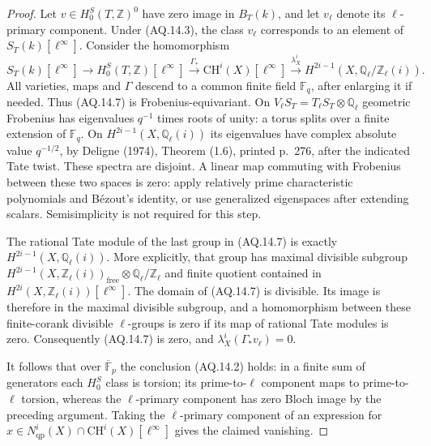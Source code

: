 \documentclass[11pt,a4paper]{article}
\theoremstyle{definition}\newtheorem{definition}[theorem]{Definition}
\theoremstyle{remark}\newtheorem{remark}[theorem]{Remark}
\begin{document}
\begin{proof}
Let $v\in H_0^S(T,\mathbb Z)^0$ have zero image in $B_T(k)$,
and let $v_\ell$ denote its $\ell$-primary component.
Under (AQ.14.3), the class $v_\ell$ corresponds to an
element of $S_T(k)[\ell^\infty]$. Consider the homomorphism
\[
 S_T(k)[\ell^\infty]\longrightarrow
 H_0^S(T,\mathbb Z)[\ell^\infty]
 \xrightarrow{\Gamma_*}\mathrm{CH}^i(X)[\ell^\infty]
 \xrightarrow{\lambda_X^i}
 H^{2i-1}(X,\mathbb Q_\ell/\mathbb Z_\ell(i)).                \tag{AQ.14.7}
\]
All varieties, maps and $\Gamma$ descend to a common finite
field $\mathbb F_q$, after enlarging it if needed. Thus
(AQ.14.7) is Frobenius-equivariant. On
$V_\ell S_T=T_\ell S_T\otimes\mathbb Q_\ell$ geometric
Frobenius has eigenvalues $q^{-1}$ times roots of unity:
a torus splits over a finite extension of $\mathbb F_q$.
On
$H^{2i-1}(X,\mathbb Q_\ell(i))$ its eigenvalues have
complex absolute value $q^{-1/2}$, by Deligne (1974),
Theorem (1.6), printed p.~276, after the indicated Tate
twist. These spectra are disjoint. A linear map
commuting with Frobenius between these two spaces is zero:
apply relatively prime characteristic polynomials and
B\'ezout's identity, or use generalized eigenspaces
after extending scalars. Semisimplicity is not
required for this step.

The rational Tate module of the last group in (AQ.14.7)
is exactly $H^{2i-1}(X,\mathbb Q_\ell(i))$. More explicitly,
that group has maximal divisible subgroup
$H^{2i-1}(X,\mathbb Z_\ell(i))_{\mathrm{free}}
 \otimes\mathbb Q_\ell/\mathbb Z_\ell$ and finite quotient
contained in $H^{2i}(X,\mathbb Z_\ell(i))[\ell^\infty]$.
The domain of (AQ.14.7) is divisible. Its image is therefore
in the maximal divisible subgroup, and a homomorphism
between these finite-corank divisible $\ell$-groups is
zero if its map of rational Tate modules is zero.
Consequently (AQ.14.7) is zero, and
$\lambda_X^i(\Gamma_*v_\ell)=0$.

It follows that over $\overline{\mathbb F}_p$ the conclusion
(AQ.14.2) holds: in a finite sum of generators each
$H_0^S$ class is torsion; its prime-to-$\ell$ component
maps to prime-to-$\ell$ torsion, whereas the $\ell$-primary
component has zero Bloch image by the preceding argument.
Taking the $\ell$-primary component of an expression for
$x\in N^i_{\mathrm{qp}}(X)\cap\mathrm{CH}^i(X)[\ell^\infty]$
gives the claimed vanishing.


\end{proof}
\end{document}
